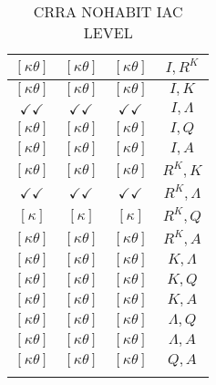 \documentclass[a4paper,10pt]{article}
\begin{document}
\begin{longtable}{|c|c|c|c|}
\hline
$[\kappa \theta ]$ & $[\kappa \theta ]$ & $[\kappa \theta ]$ & ${I},{R^{K}}$ \\
\hline
$[\kappa \theta ]$ & $[\kappa \theta ]$ & $[\kappa \theta ]$ & ${I},{K}$ \\
\hline
$\checkmark\checkmark$ & $\checkmark\checkmark$ & $\checkmark\checkmark$ & ${I},{\Lambda}$ \\
\hline
$[\kappa \theta ]$ & $[\kappa \theta ]$ & $[\kappa \theta ]$ & ${I},{Q}$ \\
\hline
$[\kappa \theta ]$ & $[\kappa \theta ]$ & $[\kappa \theta ]$ & ${I},{A}$ \\
\hline
$[\kappa \theta ]$ & $[\kappa \theta ]$ & $[\kappa \theta ]$ & ${R^{K}},{K}$ \\
\hline
$\checkmark\checkmark$ & $\checkmark\checkmark$ & $\checkmark\checkmark$ & ${R^{K}},{\Lambda}$ \\
\hline
$[\kappa ]$ & $[\kappa ]$ & $[\kappa ]$ & ${R^{K}},{Q}$ \\
\hline
$[\kappa \theta ]$ & $[\kappa \theta ]$ & $[\kappa \theta ]$ & ${R^{K}},{A}$ \\
\hline
$[\kappa \theta ]$ & $[\kappa \theta ]$ & $[\kappa \theta ]$ & ${K},{\Lambda}$ \\
\hline
$[\kappa \theta ]$ & $[\kappa \theta ]$ & $[\kappa \theta ]$ & ${K},{Q}$ \\
\hline
$[\kappa \theta ]$ & $[\kappa \theta ]$ & $[\kappa \theta ]$ & ${K},{A}$ \\
\hline
$[\kappa \theta ]$ & $[\kappa \theta ]$ & $[\kappa \theta ]$ & ${\Lambda},{Q}$ \\
\hline
$[\kappa \theta ]$ & $[\kappa \theta ]$ & $[\kappa \theta ]$ & ${\Lambda},{A}$ \\
\hline
$[\kappa \theta ]$ & $[\kappa \theta ]$ & $[\kappa \theta ]$ & ${Q},{A}$ \\
\hline
\caption{CRRA NOHABIT IAC LEVEL}
\label{table:MyTableLabel}
\end{longtable}
\end{document}
